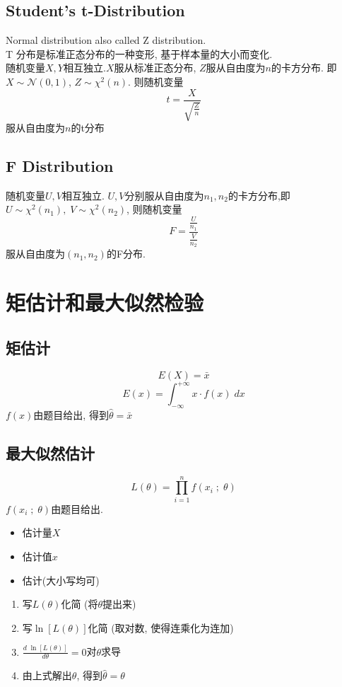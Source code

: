 \documentclass[a4paper]{report}
\begin{document}
\subsection{Student's t-Distribution}
Normal distribution also called Z distribution. \\
T 分布是标准正态分布的一种变形, 基于样本量的大小而变化. \\
随机变量$X,Y$相互独立.$X$服从标准正态分布, $Z$服从自由度为$n$的卡方分布. 即$X\sim\mathcal{N}(0,1)$, $Z\sim \chi^2(n)$. 则随机变量$$t=\frac{X}{\sqrt{\frac{Z}{n}}}$$服从自由度为$n$的t分布
\subsection{F Distribution}
随机变量$U,V$相互独立. $U,V$分别服从自由度为$n_1,n_2$的卡方分布,即$U\sim \chi^2(n_1),\;V\sim \chi^2(n_2)$, 则随机变量
$$F=\frac{\frac{U}{n_1}}{\frac{V}{n_2}}$$
服从自由度为$(n_1,n_2)$的F分布. 
\section{矩估计和最大似然检验}
\subsection{矩估计}
$$E(X)=\bar{x}$$
$$E(x)=\int_{-\infty}^{+\infty}x\cdot f(x)\;dx$$
$f(x)$由题目给出, 
得到$\hat{\theta}=\bar{x}$
\subsection{最大似然估计}
$$L(\theta)=\prod^n_{i=1}f(x_i\;;\;\theta)$$
$f(x_i\;;\;\theta)$由题目给出. 
\begin{itemize}
  \item 估计量$X$
  \item 估计值$x$
  \item 估计(大小写均可)
\end{itemize}
\begin{enumerate}
  \item 写$L(\theta)$化简 (将$\theta$提出来)
  \item 写$\ln[L(\theta)]$化简 (取对数, 使得连乘化为连加)
  \item $\frac{d \;\ln[L(\theta)] }{d \theta}=0$对$\theta$求导
  \item 由上式解出$\theta$, 得到$\hat{\theta}=\theta$
\end{enumerate}
\end{document}
